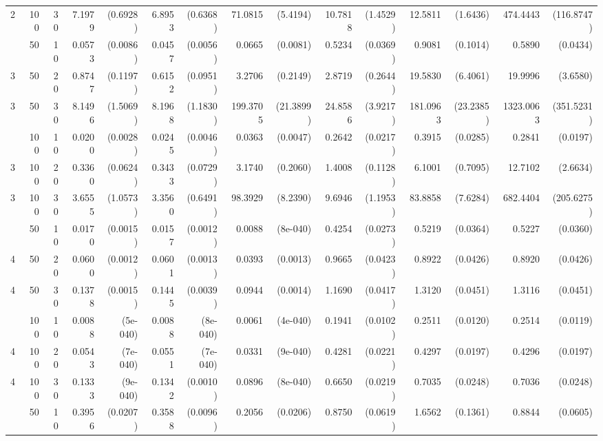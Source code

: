 \begin{table}[ht]
\begin{small}
\begin{tabular}{lrr|rr|rr|rr|rr|rr|rr}
  2 & 100 & 30 & 7.1979 & (0.6928) & 6.8953 & (0.6368) & 71.0815 & (5.4194) & 10.7818 & (1.4529) & 12.5811 & (1.6436) & 474.4443 & (116.8747) \\ 
\hdashline
\hdashline
  3 & 50 & 10 & 0.0573 & (0.0086) & 0.0457 & (0.0056) & 0.0665 & (0.0081) & 0.5234 & (0.0369) & 0.9081 & (0.1014) & 0.5890 & (0.0434) \\ 
  3 & 50 & 20 & 0.8747 & (0.1197) & 0.6152 & (0.0951) & 3.2706 & (0.2149) & 2.8719 & (0.2644) & 19.5830 & (6.4061) & 19.9996 & (3.6580) \\ 
  3 & 50 & 30 & 8.1496 & (1.5069) & 8.1968 & (1.1830) & 199.3705 & (21.3899) & 24.8586 & (3.9217) & 181.0963 & (23.2385) & 1323.0063 & (351.5231) \\ 
\hdashline
  3 & 100 & 10 & 0.0200 & (0.0028) & 0.0245 & (0.0046) & 0.0363 & (0.0047) & 0.2642 & (0.0217) & 0.3915 & (0.0285) & 0.2841 & (0.0197) \\ 
  3 & 100 & 20 & 0.3360 & (0.0624) & 0.3433 & (0.0729) & 3.1740 & (0.2060) & 1.4008 & (0.1128) & 6.1001 & (0.7095) & 12.7102 & (2.6634) \\ 
  3 & 100 & 30 & 3.6555 & (1.0573) & 3.3560 & (0.6491) & 98.3929 & (8.2390) & 9.6946 & (1.1953) & 83.8858 & (7.6284) & 682.4404 & (205.6275) \\ 
\hdashline
\hdashline
  4 & 50 & 10 & 0.0170 & (0.0015) & 0.0157 & (0.0012) & 0.0088 & (8e-040) & 0.4254 & (0.0273) & 0.5219 & (0.0364) & 0.5227 & (0.0360) \\ 
  4 & 50 & 20 & 0.0600 & (0.0012) & 0.0601 & (0.0013) & 0.0393 & (0.0013) & 0.9665 & (0.0423) & 0.8922 & (0.0426) & 0.8920 & (0.0426) \\ 
  4 & 50 & 30 & 0.1378 & (0.0015) & 0.1445 & (0.0039) & 0.0944 & (0.0014) & 1.1690 & (0.0417) & 1.3120 & (0.0451) & 1.3116 & (0.0451) \\ 
\hdashline
  4 & 100 & 10 & 0.0088 & (5e-040) & 0.0088 & (8e-040) & 0.0061 & (4e-040) & 0.1941 & (0.0102) & 0.2511 & (0.0120) & 0.2514 & (0.0119) \\ 
  4 & 100 & 20 & 0.0543 & (7e-040) & 0.0551 & (7e-040) & 0.0331 & (9e-040) & 0.4281 & (0.0221) & 0.4297 & (0.0197) & 0.4296 & (0.0197) \\ 
  4 & 100 & 30 & 0.1333 & (9e-040) & 0.1342 & (0.0010) & 0.0896 & (8e-040) & 0.6650 & (0.0219) & 0.7035 & (0.0248) & 0.7036 & (0.0248) \\ 
\hdashline
\hdashline
  5 & 50 & 10 & 0.3956 & (0.0207) & 0.3588 & (0.0096) & 0.2056 & (0.0206) & 0.8750 & (0.0619) & 1.6562 & (0.1361) & 0.8844 & (0.0605) \\ 

\end{tabular}
\end{small}
\end{table}
